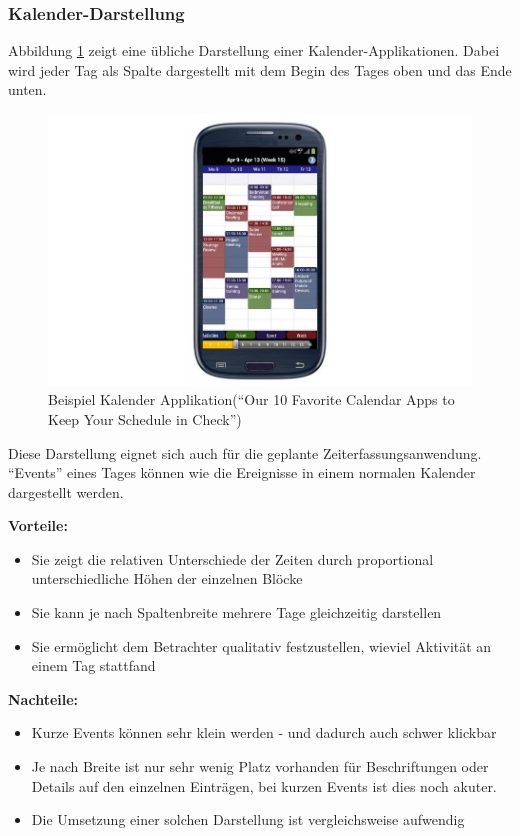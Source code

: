 \documentclass[]{article}
\begin{document}
\subsubsection{Kalender-Darstellung}\label{kalender-darstellung}

Abbildung \ref{figCalendar} zeigt eine übliche Darstellung einer
Kalender-Applikationen. Dabei wird jeder Tag als Spalte dargestellt mit
dem Begin des Tages oben und das Ende unten.

\begin{figure}[htbp]
\centering
\includegraphics{../img/calendar.jpg}
\caption{Beispiel Kalender Applikation\label{figCalendar}(``Our 10
Favorite Calendar Apps to Keep Your Schedule in Check'')}
\end{figure}

Diese Darstellung eignet sich auch für die geplante
Zeiterfassungsanwendung. ``Events'' eines Tages können wie die
Ereignisse in einem normalen Kalender dargestellt werden.

\textbf{Vorteile:}

\begin{itemize}
\itemsep1pt\parskip0pt
\item
  Sie zeigt die relativen Unterschiede der Zeiten durch proportional
  unterschiedliche Höhen der einzelnen Blöcke
\item
  Sie kann je nach Spaltenbreite mehrere Tage gleichzeitig darstellen
\item
  Sie ermöglicht dem Betrachter qualitativ festzustellen, wieviel
  Aktivität an einem Tag stattfand
\end{itemize}

\textbf{Nachteile:}

\begin{itemize}
\itemsep1pt\parskip0pt
\item
  Kurze Events können sehr klein werden - und dadurch auch schwer
  klickbar
\item
  Je nach Breite ist nur sehr wenig Platz vorhanden für Beschriftungen
  oder Details auf den einzelnen Einträgen, bei kurzen Events ist dies
  noch akuter.
\item
  Die Umsetzung einer solchen Darstellung ist vergleichsweise aufwendig
\end{itemize}
\end{document}
